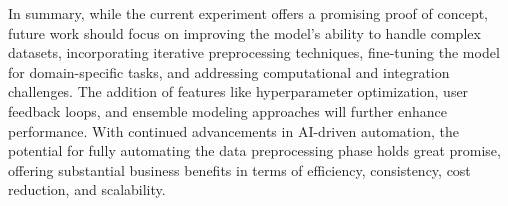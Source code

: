 


In summary, while the current experiment offers a promising proof of concept, future work should focus on improving the model's ability to handle complex datasets, incorporating iterative preprocessing techniques, fine-tuning the model for domain-specific tasks, and addressing computational and integration challenges. The addition of features like hyperparameter optimization, user feedback loops, and ensemble modeling approaches will further enhance performance. With continued advancements in AI-driven automation, the potential for fully automating the data preprocessing phase holds great promise, offering substantial business benefits in terms of efficiency, consistency, cost reduction, and scalability.



    
    
